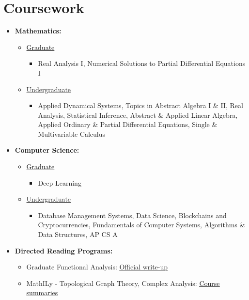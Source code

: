 \documentclass{mycv}
\begin{document}
\maketitle%

\section{Coursework}

\begin{itemize}[label={}]
    \item \textbf{Mathematics:} 
    \begin{itemize}
      \item \underline{Graduate}
        \begin{itemize}
          \item Real Analysis I, Numerical Solutions to Partial Differential Equations I 
        \end{itemize}
      \item \underline{Undergraduate}
        \begin{itemize}
          \item Applied Dynamical Systems, Topics in Abstract Algebra I \& II, Real Analysis, Statistical Inference, Abstract \& Applied Linear Algebra, Applied Ordinary \& Partial Differential Equations, Single \& Multivariable Calculus
        \end{itemize}
    \end{itemize}
    \item \textbf{Computer Science:}
    \begin{itemize}
    \item \underline{Graduate}
        \begin{itemize}
          \item Deep Learning 
        \end{itemize}
      \item \underline{Undergraduate}
        \begin{itemize}
          \item  Database Management Systems, Data Science, Blockchains and Cryptocurrencies, Fundamentals of Computer Systems, Algorithms \& Data Structures, AP CS A 
        \end{itemize}
      \end{itemize}
    \item \textbf{Directed Reading Programs:} 
      \begin{itemize} 
        \item Graduate Functional Analysis: \href{https://github.com/alizma/Spring2021_Functional_Analysis_Paper}{\underline{Official write-up}} 
        \item MathILy - Topological Graph Theory, Complex Analysis: \href{http://www.mathily.org/facts.html}{\underline{Course summaries}}
      \end{itemize}
\end{itemize}
\end{document}
